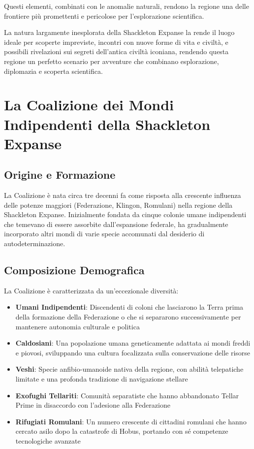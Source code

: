 \documentclass[letterpaper,twocolumn,openany,nodeprecatedcode]{dndbook}
\begin{document}
Questi elementi, combinati con le anomalie naturali, rendono la regione una delle frontiere più promettenti e pericolose per l'esplorazione scientifica.

La natura largamente inesplorata della Shackleton Expanse la rende il luogo ideale per scoperte impreviste, incontri con nuove forme di vita e civiltà, e possibili rivelazioni sui segreti dell'antica civiltà iconiana, rendendo questa regione un perfetto scenario per avventure che combinano esplorazione, diplomazia e scoperta scientifica.

\section{La Coalizione dei Mondi Indipendenti della Shackleton Expanse}
\subsection{Origine e Formazione}
La Coalizione è nata circa tre decenni fa come risposta alla crescente influenza delle potenze maggiori (Federazione, Klingon, Romulani) nella regione della Shackleton Expanse. Inizialmente fondata da cinque colonie umane indipendenti che temevano di essere assorbite dall'espansione federale, ha gradualmente incorporato altri mondi di varie specie accomunati dal desiderio di autodeterminazione.
\subsection{Composizione Demografica}
La Coalizione è caratterizzata da un'eccezionale diversità:

\begin{itemize}
    \item \textbf{Umani Indipendenti}: Discendenti di coloni che lasciarono la Terra prima della formazione della Federazione o che si separarono successivamente per mantenere autonomia culturale e politica
    \item \textbf{Caldosiani}: Una popolazione umana geneticamente adattata ai mondi freddi e piovosi, sviluppando una cultura focalizzata sulla conservazione delle risorse
    \item \textbf{Veshi}: Specie anfibio-umanoide nativa della regione, con abilità telepatiche limitate e una profonda tradizione di navigazione stellare
    \item \textbf{Exofughi Tellariti}: Comunità separatiste che hanno abbandonato Tellar Prime in disaccordo con l'adesione alla Federazione
    \item \textbf{Rifugiati Romulani}: Un numero crescente di cittadini romulani che hanno cercato asilo dopo la catastrofe di Hobus, portando con sé competenze tecnologiche avanzate
\end{itemize}
\end{document}
